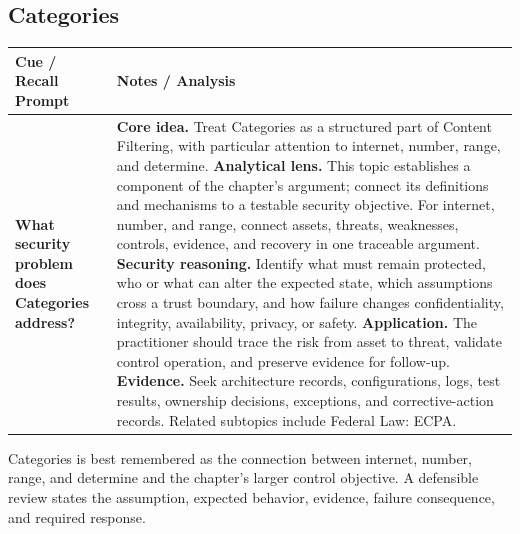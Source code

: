\documentclass[11pt]{article}
\newcommand{\CornellHeader}{%
\rowcolor{Navy}\color{white}\bfseries Cue / Recall Prompt & \color{white}\bfseries Notes / Analysis\\\hline}
\newcommand{\CornellRow}[2]{%
\cellcolor{CueGray}\RaggedRight\textbf{#1} & \RaggedRight #2\\\hline}
\begin{document}
\subsection*{Categories}
\begin{longtable}{>{\RaggedRight\arraybackslash}p{}|>{\RaggedRight\arraybackslash}p{}}
\CornellHeader
\CornellRow{What security problem does Categories address?}{\textbf{Core idea.} Treat Categories as a structured part of Content Filtering, with particular attention to internet, number, range, and determine. \textbf{Analytical lens.} This topic establishes a component of the chapter's argument; connect its definitions and mechanisms to a testable security objective. For internet, number, and range, connect assets, threats, weaknesses, controls, evidence, and recovery in one traceable argument. \textbf{Security reasoning.} Identify what must remain protected, who or what can alter the expected state, which assumptions cross a trust boundary, and how failure changes confidentiality, integrity, availability, privacy, or safety. \textbf{Application.} The practitioner should trace the risk from asset to threat, validate control operation, and preserve evidence for follow-up. \textbf{Evidence.} Seek architecture records, configurations, logs, test results, ownership decisions, exceptions, and corrective-action records. Related subtopics include Federal Law: ECPA.}
\end{longtable}
\begin{topicsummary}
Categories is best remembered as the connection between internet, number, range, and determine and the chapter's larger control objective. A defensible review states the assumption, expected behavior, evidence, failure consequence, and required response.
\end{topicsummary}
\end{document}
